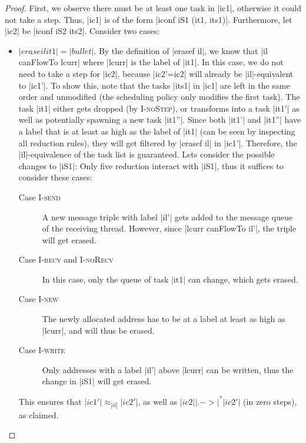 \begin{proof}
  First, we observe there must be at least one task in |ic1|, otherwise
  it could not take a step.  Thus, |ic1| is of the form
  |iconf iS1 (it1, its1)|.
  Furthermore, let |ic2| be |iconf iS2 its2|.
  Consider two cases:
  \begin{itemize}
    \item $|erase il it1|=|bullet|$.
    By the definition of |erasef il|, we know that |il canFlowTo lcurr|
    where |lcurr| is the label of |it1|.
    In this case, we do not need to take a step for
    |ic2|, because |ic2'=ic2| will already be |il|-equivalent to |ic1'|.
    To show this, note that the tasks |its1| in |ic1| are left in the
    same order and unmodified (the scheduling policy only
    modifies the first task). The task |it1| either
    gets dropped (by \textsc{I-noStep}), or
    transforms into a task |it1'| as well as potentially spawning a new
    task |it1''|.  Since both |it1'| and |it1''| have a label that is
    at least as high as the label of |it1| (can be seen
    by inspecting all reduction rules), they will get filtered
    by |erasef il| in |ic1'|.  Therefore, the |il|-equivalence of the
    task list is guaranteed.
    Lets consider the possible changes to |iS1|:
    Only five reduction interact with |iS1|,
    thus it suffices to consider these cases:
    \begin{description}
      \item[Case \textsc{I-send}]
      A new message triple with label |il'| gets added to the message
      queue of the receiving thread.  However, since |lcurr canFlowTo il'|,
      the triple will get erased.
      \item[Case \textsc{I-recv} and \textsc{I-noRecv}]
      In this case, only the queue of
      task |it1| can change, which gets erased.
      \item[Case \textsc{I-new}] The newly allocated address has to be at a
      label at least as high as |lcurr|, and will thus be erased.
      \item[Case \textsc{I-write}] Only addresses with a label |il'| above
      |lcurr| can be written, thus the change in |iS1| will get erased.
    \end{description}
    This ensures that $|ic1'|\approx_{|il|}|ic2'|$, as well as
    $|ic2| |.->|^* |ic2'|$ (in zero steps), as claimed.

\end{itemize}
\end{proof}
